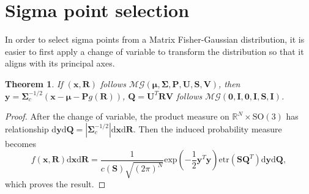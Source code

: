 \documentclass[12pt]{article}
\newtheorem{theorem}{Theorem}
\begin{document}
\section{Sigma point selection}
In order to select sigma points from a Matrix Fisher-Gaussian distribution, it is easier to first apply a change of variable to transform the distribution so that it aligns with its principal axes.
\begin{theorem}
	If $(\bm{x},\mathbf{R})$ follows $\mathcal{MG}(\bm{\mu},\mathbf{\Sigma},\mathbf{P},\mathbf{U},\mathbf{S},\mathbf{V})$, then $\bm{y}=\mathbf{\Sigma}_c^{-1/2}\left(\bm{x}-\bm{\mu}-\mathbf{P}g(\mathbf{R})\right)$, $\mathbf{Q} = \mathbf{U}^T\mathbf{R}\mathbf{V}$ follows $\mathcal{MG}(\bm{0},\mathbf{I},\mathbf{0},\mathbf{I},\mathbf{S},\mathbf{I})$.
\end{theorem}
\begin{proof}
	After the change of variable, the product measure on $\mathbb{R}^N\times\mathrm{SO}(3)$ has relationship $\mathrm{d}\bm{y}\mathrm{d}\mathbf{Q} = \left|\mathbf{\Sigma}_c^{-1/2}\right|\mathrm{d}\bm{x}\mathrm{d}\mathbf{R}$.
	Then the induced probability measure becomes
	\begin{equation}
		f(\bm{x},\mathbf{R})\mathrm{d}\bm{x}\mathrm{d}\mathbf{R} = \frac{1}{c(\mathbf{S})\sqrt{(2\pi)^N}}\mathrm{exp}(-\frac{1}{2}\bm{y}^T\bm{y})\mathrm{etr}(\mathbf{S}\mathbf{Q}^T)\mathrm{d}\bm{y}\mathrm{d}\mathbf{Q},
	\end{equation}
	which proves the result.
\end{proof}
\end{document}
